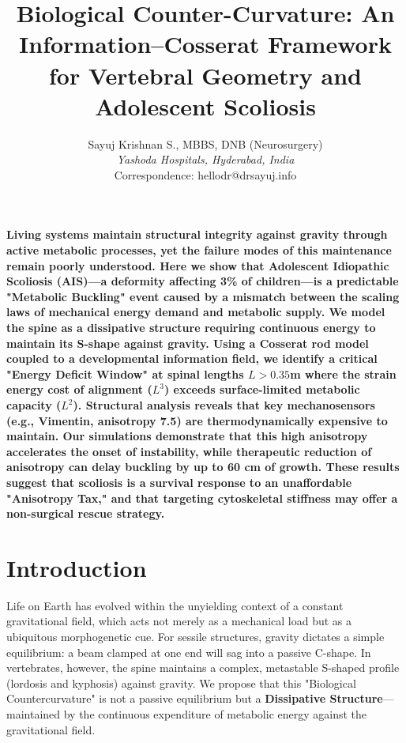 \documentclass[11pt]{article}
\title{Biological Counter-Curvature: An Information–Cosserat Framework for Vertebral Geometry and Adolescent Scoliosis}
\author{Sayuj Krishnan S., MBBS, DNB (Neurosurgery) \\
\textit{Yashoda Hospitals, Hyderabad, India} \\
Correspondence: hellodr@drsayuj.info}
\date{}
\begin{document}
\maketitle

\textbf{Living systems maintain structural integrity against gravity through active metabolic processes, yet the failure modes of this maintenance remain poorly understood. Here we show that Adolescent Idiopathic Scoliosis (AIS)—a deformity affecting 3\% of children—is a predictable "Metabolic Buckling" event caused by a mismatch between the scaling laws of mechanical energy demand and metabolic supply. We model the spine as a dissipative structure requiring continuous energy to maintain its S-shape against gravity. Using a Cosserat rod model coupled to a developmental information field, we identify a critical "Energy Deficit Window" at spinal lengths $L > 0.35$m where the strain energy cost of alignment ($L^3$) exceeds surface-limited metabolic capacity ($L^2$). Structural analysis reveals that key mechanosensors (e.g., Vimentin, anisotropy 7.5) are thermodynamically expensive to maintain. Our simulations demonstrate that this high anisotropy accelerates the onset of instability, while therapeutic reduction of anisotropy can delay buckling by up to 60 cm of growth. These results suggest that scoliosis is a survival response to an unaffordable "Anisotropy Tax," and that targeting cytoskeletal stiffness may offer a non-surgical rescue strategy.}

\section*{Introduction}

Life on Earth has evolved within the unyielding context of a constant gravitational field, which acts not merely as a mechanical load but as a ubiquitous morphogenetic cue\cite{thompson1917growth}. For sessile structures, gravity dictates a simple equilibrium: a beam clamped at one end will sag into a passive C-shape. In vertebrates, however, the spine maintains a complex, metastable S-shaped profile (lordosis and kyphosis) against gravity\cite{latimer2005upright}. We propose that this "Biological Countercurvature" is not a passive equilibrium but a \textbf{Dissipative Structure}—maintained by the continuous expenditure of metabolic energy against the gravitational field.
\end{document}
